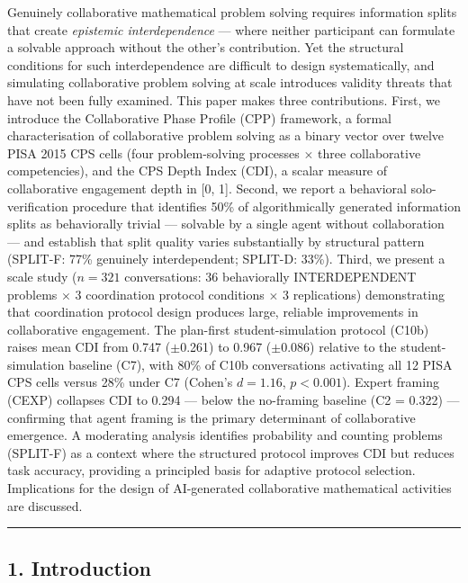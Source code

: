 \documentclass[
  11pt,
]{article}
\begin{document}
Genuinely collaborative mathematical problem solving requires information splits that create \emph{epistemic interdependence} --- where neither participant can formulate a solvable approach without the other's contribution. Yet the structural conditions for such interdependence are difficult to design systematically, and simulating collaborative problem solving at scale introduces validity threats that have not been fully examined. This paper makes three contributions. First, we introduce the Collaborative Phase Profile (CPP) framework, a formal characterisation of collaborative problem solving as a binary vector over twelve PISA 2015 CPS cells (four problem-solving processes $\times$ three collaborative competencies), and the CPS Depth Index (CDI), a scalar measure of collaborative engagement depth in {[}0, 1{]}. Second, we report a behavioral solo-verification procedure that identifies 50\% of algorithmically generated information splits as behaviorally trivial --- solvable by a single agent without collaboration --- and establish that split quality varies substantially by structural pattern (SPLIT-F: 77\% genuinely interdependent; SPLIT-D: 33\%). Third, we present a scale study ($n = 321$ conversations: 36 behaviorally INTERDEPENDENT problems $\times$ 3 coordination protocol conditions $\times$ 3 replications) demonstrating that coordination protocol design produces large, reliable improvements in collaborative engagement. The plan-first student-simulation protocol (C10b) raises mean CDI from 0.747 ($\pm$0.261) to 0.967 ($\pm$0.086) relative to the student-simulation baseline (C7), with 80\% of C10b conversations activating all 12 PISA CPS cells versus 28\% under C7 (Cohen's $d = 1.16$, $p < 0.001$). Expert framing (CEXP) collapses CDI to 0.294 --- below the no-framing baseline (C2 = 0.322) --- confirming that agent framing is the primary determinant of collaborative emergence. A moderating analysis identifies probability and counting problems (SPLIT-F) as a context where the structured protocol improves CDI but reduces task accuracy, providing a principled basis for adaptive protocol selection. Implications for the design of AI-generated collaborative mathematical activities are discussed.

\begin{center}\rule{0.5\linewidth}{0.5pt}\end{center}

\subsection{1. Introduction}\label{introduction}
\end{document}
